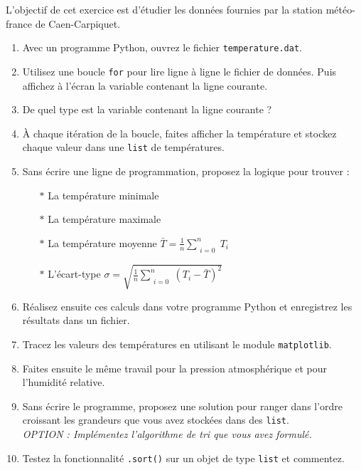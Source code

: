L'objectif de cet exercice est d'étudier les données fournies par la station météo-france
de Caen-Carpiquet.
\begin{enumerate}
\item Avec un programme Python, ouvrez le fichier \texttt{temperature.dat}.

\item Utilisez une boucle \texttt{for} pour lire ligne à ligne le fichier de données.
  Puis affichez à l'écran la variable contenant la ligne courante.

\item De quel type est la variable contenant la ligne courante ?


\item À chaque itération de la boucle, faites afficher la température et stockez chaque valeur dans une \texttt{list} de températures.

\item Sans écrire une ligne de programmation, proposez la logique pour trouver :
  \begin{itemize}
  \item[$\ast$] La température minimale
  \item[$\ast$] La température maximale
  \item[$\ast$] La température moyenne    $ \bar{T}= \frac{1}{n}  \sum\limits_{\substack{i=0}}^{n}{T_i}$
  \item[$\ast$] L'écart-type  $\sigma = \sqrt{\frac{1}{n}  \sum\limits_{\substack{i=0}}^{n}{} (T_i-\bar{T})^2   }$
  \end{itemize}

\item Réalisez ensuite ces calculs dans votre programme Python et enregistrez les résultats dans un fichier.

\item Tracez les valeurs des températures en utilisant le module \texttt{matplotlib}.

\item Faites ensuite le même travail pour la pression atmosphérique et pour l'humidité relative.

\item Sans écrire le programme, proposez une solution pour ranger dans l'ordre croissant
  les grandeurs que vous avez stockées dans des \texttt{list}.\\
  \textit{OPTION : Implémentez l'algorithme de tri que vous avez formulé.}

\item Testez la fonctionnalité \texttt{.sort()} sur un objet de type \texttt{list} et commentez.

\end{enumerate}
